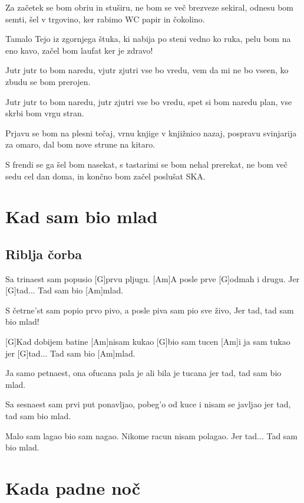 \documentclass[a4paper,12pt]{article}
\begin{document}
\begin{multicols}{2}
\begin{guitar}
Za začetek se bom obriu in stuširu,
ne bom se več brezveze sekiral,
odnesu bom semti, šel v trgovino,
ker rabimo WC papir in čokolino.


Tamalo Tejo iz zgornjega štuka,
ki nabija po steni vedno ko ruka,
pelu bom na eno kavo,
začel bom laufat ker je zdravo!


Jutr jutr to bom naredu,
vjutr zjutri vse bo vredu,
vem da mi ne bo vseen,
ko zbudu se bom prerojen.


Jutr jutr to bom naredu,
jutr zjutri vse bo vredu,
spet si bom naredu plan,
vse skrbi bom vrgu stran.


Prjavu se bom na plesni tečaj,
vrnu knjige v knjižnico nazaj,
pospravu svinjarija za omaro,
dal bom nove strune na kitaro.


S frendi se ga šel bom nasekat,
s tastarimi se bom nehal prerekat,
ne bom več sedu cel dan doma,
in končno bom začel poslušat SKA.

\end{guitar}
\section{Kad sam bio mlad}
\subsection*{Riblja čorba}
\begin{guitar}
[Am]Sa trinaest sam popusio [G]prvu pljugu.
[Am]A posle prve [G]odmah i drugu.
Jer [G]tad... Tad sam bio [Am]mlad.



S četrne'st sam popio prvo pivo,
a posle piva sam pio sve živo,
Jer tad, tad sam bio mlad!



[G]Kad dobijem batine
[Am]nisam kukao
[G]bio sam tucen
[Am]i ja sam tukao
jer [G]tad...  Tad sam bio [Am]mlad.



Ja samo petnaest, ona ofucana
pala je ali bila je tucana
jer tad, tad sam bio mlad.



Sa sesnaest sam prvi put ponavljao,
pobeg'o od kuce i nisam se javljao
jer tad, tad sam bio mlad.



Malo sam lagao bio sam nagao.
Nikome racun nisam polagao.
Jer tad... Tad sam bio mlad.



\end{guitar}
\section{Kada padne noč}

\end{multicols}
\end{document}
